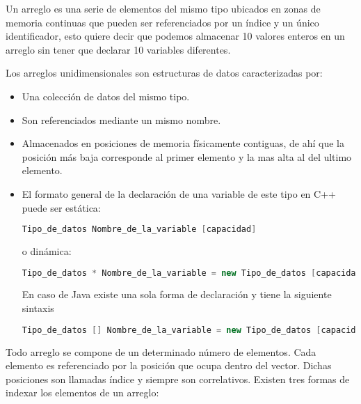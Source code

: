 Un arreglo es una serie de elementos del mismo tipo ubicados en zonas de memoria
continuas que pueden ser referenciados por un índice y un único identificador, esto quiere
decir que podemos almacenar 10 valores enteros en un arreglo sin tener que declarar 10
variables diferentes.

Los arreglos unidimensionales son estructuras de datos caracterizadas por:

\begin{itemize}
	\item Una colección de datos del mismo tipo.
	\item Son referenciados mediante un mismo nombre.
	\item Almacenados en posiciones de memoria físicamente contiguas, de ahí que la posición más
	baja corresponde al primer elemento y la mas alta al del ultimo elemento.
	\item El formato general de la declaración de una variable de este tipo en C++ puede ser estática:
	
	\begin{lstlisting}[language=C++]
   Tipo_de_datos Nombre_de_la_variable [capacidad]
	\end{lstlisting}
	
	o dinámica:
	
	\begin{lstlisting}[language=C++]
   Tipo_de_datos * Nombre_de_la_variable = new Tipo_de_datos [capacidad]
	\end{lstlisting}
    
    En caso de Java existe una sola forma de declaración y tiene la siguiente sintaxis

    \begin{lstlisting}[language=Java]
   Tipo_de_datos [] Nombre_de_la_variable = new Tipo_de_datos [capacidad]
    \end{lstlisting}
 
\end{itemize}

Todo arreglo se compone de un determinado número de elementos. Cada elemento es referenciado por la posición que ocupa dentro del vector. Dichas posiciones son llamadas índice y siempre son correlativos. Existen tres formas de indexar los elementos de un arreglo:

